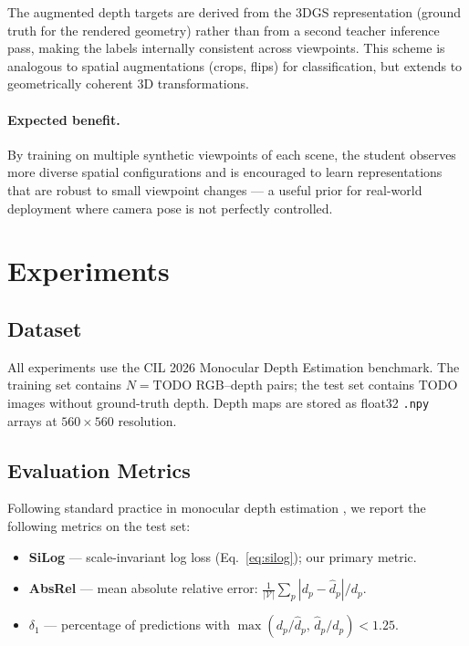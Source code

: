 \documentclass{article}
\begin{document}
The augmented depth targets are derived from the 3DGS representation (ground truth for the rendered geometry) rather than from a second teacher inference pass, making the labels internally consistent across viewpoints.
This scheme is analogous to spatial augmentations (crops, flips) for classification, but extends to geometrically coherent 3D transformations.

\paragraph{Expected benefit.}
By training on multiple synthetic viewpoints of each scene, the student observes more diverse spatial configurations and is encouraged to learn representations that are robust to small viewpoint changes — a useful prior for real-world deployment where camera pose is not perfectly controlled.


\section{Experiments}
\label{sec:experiments}

\subsection{Dataset}

All experiments use the CIL 2026 Monocular Depth Estimation benchmark.
The training set contains $N = \text{TODO}$ RGB–depth pairs; the test set contains $\text{TODO}$ images without ground-truth depth.
Depth maps are stored as float32 \texttt{.npy} arrays at $560 \times 560$ resolution.

\subsection{Evaluation Metrics}

Following standard practice in monocular depth estimation \cite{TODO_eigen2014}, we report the following metrics on the test set:
\begin{itemize}
    \item \textbf{SiLog} — scale-invariant log loss (Eq.~\ref{eq:silog}); our primary metric.
    \item \textbf{AbsRel} — mean absolute relative error: $\frac{1}{|\mathcal{V}|}\sum_{p} |d_p - \hat{d}_p| / d_p$.
    \item \textbf{$\delta_1$} — percentage of predictions with $\max(d_p/\hat{d}_p,\, \hat{d}_p/d_p) < 1.25$.
\end{itemize}
\end{document}
